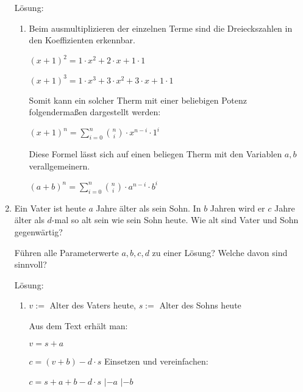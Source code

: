 \documentclass[main.tex]{subfiles}
\begin{document}
\begin{enumerate}
	      Lösung:
	      \begin{enumerate}
		      \item Beim ausmultiplizieren der einzelnen Terme sind die Dreieckszahlen in den Koeffizienten erkennbar.

		            \(
		            (x + 1)^2 = 1 \cdot x^2 + 2 \cdot x + 1 \cdot 1
		            \)

		            \(
		            (x + 1)^3 = 1 \cdot x^3 + 3 \cdot x^2 + 3 \cdot x + 1 \cdot 1
		            \)

		            Somit kann ein solcher Therm mit einer beliebigen Potenz folgendermaßen dargestellt werden:

		            \(
		            (x + 1)^n = \sum_{i = 0}^{n} \binom{n}{i} \cdot x^{n-i} \cdot 1^i
		            \)

		            Diese Formel lässt sich auf einen beliegen Therm mit den Variablen \(
		            a, b
		            \) verallgemeinern.

		            \(
		            (a + b)^n = \sum_{i = 0}^{n} \binom{n}{i} \cdot a^{n-i} \cdot b^i
		            \)
	      \end{enumerate}
	\item Ein Vater ist heute \(
	      a
	      \) Jahre älter als sein Sohn.
	      In \(
	      b
	      \) Jahren wird er \(
	      c
	      \) Jahre älter als \(
	      d
	      \)-mal so alt sein wie sein Sohn heute.
	      Wie alt sind Vater und Sohn gegenwärtig?

	      Führen alle Parameterwerte \(
	      a, b, c, d
	      \) zu einer Lösung?
	      Welche davon sind sinnvoll?

	      Lösung:
	      \begin{enumerate}
		      \item
		            \(
		            v :=
		            \) Alter des Vaters heute,
		            \(
		            s :=
		            \) Alter des Sohns heute

		            Aus dem Text erhält man:

		            \(
		            v = s + a
		            \)

		            \(
		            c = (v + b) - d \cdot s
		            \)
		            Einsetzen und vereinfachen:

		            \(
		            c = s + a + b - d \cdot s
		            \)
		            \(|\)\(
		            - a
		            \)
		            \(|\)\(
		            - b
		            \)


\end{enumerate}
\end{enumerate}
\end{document}
